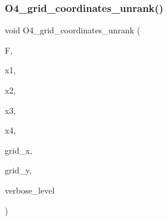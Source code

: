 \mbox{\label{group__generators_8_c_a5e8a182ab1a37c8b099619c13b52e3aa}} 
\subsubsection{\texorpdfstring{O4\+\_\+grid\+\_\+coordinates\+\_\+unrank()}{O4\_grid\_coordinates\_unrank()}}
{\footnotesize\ttfamily void O4\+\_\+grid\+\_\+coordinates\+\_\+unrank (\begin{DoxyParamCaption}\item[{\mbox{\hyperlink{classfinite__field}{finite\+\_\+field}} \&}]{F,  }\item[{\mbox{\hyperlink{galois_8h_a09fddde158a3a20bd2dcadb609de11dc}{I\+NT}} \&}]{x1,  }\item[{\mbox{\hyperlink{galois_8h_a09fddde158a3a20bd2dcadb609de11dc}{I\+NT}} \&}]{x2,  }\item[{\mbox{\hyperlink{galois_8h_a09fddde158a3a20bd2dcadb609de11dc}{I\+NT}} \&}]{x3,  }\item[{\mbox{\hyperlink{galois_8h_a09fddde158a3a20bd2dcadb609de11dc}{I\+NT}} \&}]{x4,  }\item[{\mbox{\hyperlink{galois_8h_a09fddde158a3a20bd2dcadb609de11dc}{I\+NT}}}]{grid\+\_\+x,  }\item[{\mbox{\hyperlink{galois_8h_a09fddde158a3a20bd2dcadb609de11dc}{I\+NT}}}]{grid\+\_\+y,  }\item[{\mbox{\hyperlink{galois_8h_a09fddde158a3a20bd2dcadb609de11dc}{I\+NT}}}]{verbose\+\_\+level }\end{DoxyParamCaption})}

\mbox{\label{group__generators_8_c_a0928b05ef61ff7466b42b6f3cc672a37}} 
